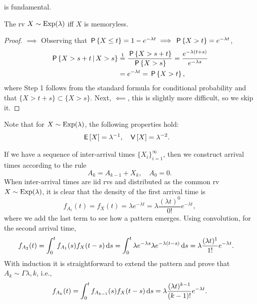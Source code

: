 \documentclass[stochastic-or.tex]{subfiles}
\begin{document}
 is fundamental.
\begin{theorem}
The rv $X\sim \Exp{\lambda}$ iff $X$ is memoryless.
\end{theorem}
\begin{proof}
$\implies$ Observing that $\P{X \leq t} = 1- e^{-\lambda t} \implies \P{X>t} = e^{-\lambda t}$,
\begin{align*}
 \P{X > s+t \given X>s} &\stackrel1= \frac{\P{X>s+t}}{\P{X>s}} = \frac{e^{-\lambda(t+s)}}{e^{-\lambda s}} \\
  &= e^{-\lambda t} =\P{X>t},
\end{align*}
where Step 1 follows from the standard formula for conditional probability and that $\{X>t+s\} \subset \{X>s\}$.
Next, $\impliedby$,  this is slightly more difficult, so we skip it. 
\end{proof}


Note that for $X\sim \Exp{\lambda}$, the following properties hold:
  \begin{align*}
  \E X &= \lambda^{-1},  &
\V X &= \lambda^{-2}.
\end{align*}

If we have a sequence of inter-arrival times $\{X_{i}\}_{i=1}^{\infty}$, then we construct arrival times according to the rule
\begin{equation*}
A_{k} = A_{k-1} + X_{k}, \quad  A_{0} = 0.
\end{equation*}
When inter-arrival times are iid rvs and distributed as the common rv $X\sim \Exp{\lambda}$, it is clear that the density of the first arrival time is
\begin{equation*}
 f_{A_{1}}(t) = f_{X} (t) = \lambda e^{-\lambda t} = \lambda \frac{(\lambda t)^{0}}{0!} e^{-\lambda t},
\end{equation*}
where we add the last term to see how a pattern emerges.
Using convolution, for the second arrival time,
\begin{align*}
  f_{A_{2}}(t) &=\int_{0}^{t} f_{A_1}(s) f_{X}(t-s)\d s = \int_{0}^{t} \lambda e^{-\lambda s} \lambda e^{-\lambda(t-s)}\d s = \lambda \frac{(\lambda t)^1}{1!} e^{-\lambda t}.
\end{align*}
With induction it  is straightforward to extend the pattern and prove that $A_{k} \sim \Gamma{\lambda, k}$, i.e.,
\begin{equation}\label{eq:e-37}
f_{A_k}(t) = \int_{0}^{t}f_{A_{k-1}}(s) f_X(t-s)\d s = \lambda \frac{(\lambda t)^{k-1}}{(k-1)!} e^{-\lambda t}.
\end{equation}
\end{document}
